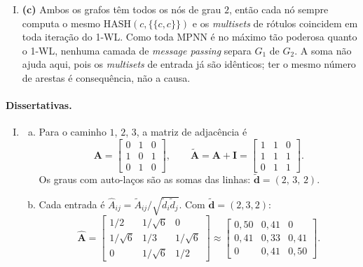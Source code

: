\documentclass{dlproblemset}
\begin{document}
\begin{enumerate}[I)]
    \item \textbf{(c)} Ambos os grafos têm todos os nós de grau $2$, então cada nó sempre computa o mesmo $\mathrm{HASH}(c, \{\!\!\{c, c\}\!\!\})$ e os \textit{multisets} de rótulos coincidem em toda iteração do 1-WL. Como toda MPNN é no máximo tão poderosa quanto o 1-WL, nenhuma camada de \textit{message passing} separa $G_1$ de $G_2$. A soma não ajuda aqui, pois os \textit{multisets} de entrada já são idênticos; ter o mesmo número de arestas é consequência, não a causa.
\end{enumerate}

\paragraph{Dissertativas.}
\begin{enumerate}[I)]
    \item
    \begin{enumerate}[(a)]
        \item Para o caminho $1$, $2$, $3$, a matriz de adjacência é
        \[
            \mathbf{A} = \begin{bmatrix} 0 & 1 & 0 \\ 1 & 0 & 1 \\ 0 & 1 & 0 \end{bmatrix},
            \qquad
            \tilde{\mathbf{A}} = \mathbf{A} + \mathbf{I} = \begin{bmatrix} 1 & 1 & 0 \\ 1 & 1 & 1 \\ 0 & 1 & 1 \end{bmatrix}.
        \]
        Os graus com auto-laços são as somas das linhas: $\tilde{\mathbf{d}} = (2,\, 3,\, 2)$.
        \item Cada entrada é $\hat A_{ij} = \tilde A_{ij}/\sqrt{\tilde d_i \tilde d_j}$. Com $\tilde{\mathbf{d}} = (2,3,2)$:
        \[
            \hat{\mathbf{A}} = \begin{bmatrix}
                1/2 & 1/\sqrt{6} & 0 \\
                1/\sqrt{6} & 1/3 & 1/\sqrt{6} \\
                0 & 1/\sqrt{6} & 1/2
            \end{bmatrix}
            \approx \begin{bmatrix}
                0{,}50 & 0{,}41 & 0 \\
                0{,}41 & 0{,}33 & 0{,}41 \\
                0 & 0{,}41 & 0{,}50
            \end{bmatrix}.
\]
\end{enumerate}
\end{enumerate}
\end{document}
